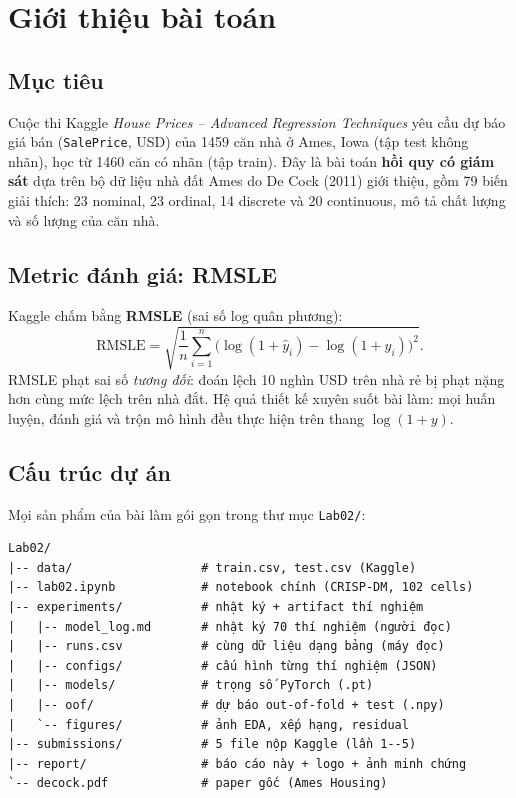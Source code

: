 \documentclass[a4paper,13pt]{article}
\begin{document}
\newpage
\tableofcontents
\newpage

\section{Giới thiệu bài toán}

\subsection{Mục tiêu}
Cuộc thi Kaggle \textit{House Prices -- Advanced Regression Techniques} yêu cầu dự báo giá bán
(\texttt{SalePrice}, USD) của 1459 căn nhà ở Ames, Iowa (tập test không nhãn), học từ 1460 căn
có nhãn (tập train). Đây là bài toán \textbf{hồi quy có giám sát} dựa trên bộ dữ liệu nhà đất
Ames do De Cock (2011) giới thiệu, gồm 79 biến giải thích: 23 nominal, 23 ordinal, 14 discrete
và 20 continuous, mô tả chất lượng và số lượng của căn nhà.

\subsection{Metric đánh giá: RMSLE}
Kaggle chấm bằng \textbf{RMSLE} (sai số log quân phương):
\[
\text{RMSLE} = \sqrt{\frac{1}{n}\sum_{i=1}^{n}\bigl(\log(1+\hat{y}_i)-\log(1+y_i)\bigr)^2}.
\]
RMSLE phạt sai số \textit{tương đối}: đoán lệch 10 nghìn USD trên nhà rẻ bị phạt nặng hơn cùng
mức lệch trên nhà đắt. Hệ quả thiết kế xuyên suốt bài làm: mọi huấn luyện, đánh giá và trộn mô
hình đều thực hiện trên thang $\log(1+y)$.

\subsection{Cấu trúc dự án}
Mọi sản phẩm của bài làm gói gọn trong thư mục \texttt{Lab02/}:
{\small
\begin{verbatim}
Lab02/
|-- data/                  # train.csv, test.csv (Kaggle)
|-- lab02.ipynb            # notebook chính (CRISP-DM, 102 cells)
|-- experiments/           # nhật ký + artifact thí nghiệm
|   |-- model_log.md       # nhật ký 70 thí nghiệm (người đọc)
|   |-- runs.csv           # cùng dữ liệu dạng bảng (máy đọc)
|   |-- configs/           # cấu hình từng thí nghiệm (JSON)
|   |-- models/            # trọng số PyTorch (.pt)
|   |-- oof/               # dự báo out-of-fold + test (.npy)
|   `-- figures/           # ảnh EDA, xếp hạng, residual
|-- submissions/           # 5 file nộp Kaggle (lần 1--5)
|-- report/                # báo cáo này + logo + ảnh minh chứng
`-- decock.pdf             # paper gốc (Ames Housing)
\end{verbatim}
}
\end{document}
